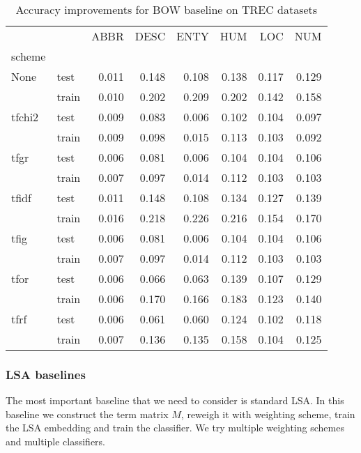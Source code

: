 \begin{table}[H]
\begin{center}

\begin{tabular}{llrrrrrr}
\toprule
{} &&  ABBR &  DESC &  ENTY &  HUM &  LOC &  NUM \\
scheme &  & & & &&&\\
\midrule
None & test & 0.011 & 0.148 & 0.108 &0.138 &0.117 &0.129 \\
{} & train & 0.010 & 0.202 & 0.209 &0.202 &0.142 &0.158 \\
tfchi2 & test & 0.009 & 0.083 & 0.006 &0.102 &0.104 &0.097 \\
{} & train & 0.009 & 0.098 & 0.015 &0.113 &0.103 &0.092 \\
tfgr & test & 0.006 & 0.081 & 0.006 &0.104 &0.104 &0.106 \\
{} & train & 0.007 & 0.097 & 0.014 &0.112 &0.103 &0.103 \\
tfidf & test & 0.011 & 0.148 & 0.108 &0.134 &0.127 &0.139 \\
{} & train & 0.016 & 0.218 & 0.226 &0.216 &0.154 &0.170 \\
tfig & test & 0.006 & 0.081 & 0.006 &0.104 &0.104 &0.106 \\
{} & train & 0.007 & 0.097 & 0.014 &0.112 &0.103 &0.103 \\
tfor & test & 0.006 & 0.066 & 0.063 &0.139 &0.107 &0.129 \\
{} & train & 0.006 & 0.170 & 0.166 &0.183 &0.123 &0.140 \\
tfrf & test & 0.006 & 0.061 & 0.060 &0.124 &0.102 &0.118 \\
{} & train & 0.007 & 0.136 & 0.135 &0.158 &0.104 &0.125 \\
\bottomrule
\end{tabular}

\caption[Accuracy improvements for BOW baseline on TREC datasets]{Accuracy improvements for BOW baseline on TREC datasets}
\label{tab:}
\end{center}
\end{table}

    \* %


    \subsubsection{LSA baselines} \label{sec:lsa:baseline}
    The most important baseline that we need to consider is standard LSA.
    In this baseline we construct the term matrix $M$, reweigh it with weighting scheme, train the LSA embedding and train the classifier.
    We try multiple weighting schemes and multiple classifiers.
    
